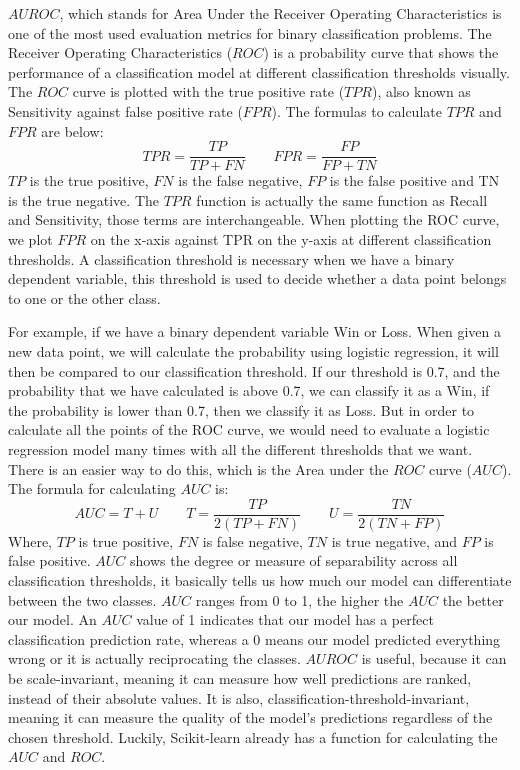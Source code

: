 \documentclass[a4paper,12pt]{report}
\begin{document}
$AUROC$, which stands for Area Under the Receiver Operating Characteristics is one of the most used evaluation metrics for binary classification problems. The Receiver Operating Characteristics ($ROC$) is a probability curve that shows the performance of a classification model at different classification thresholds visually. The $ROC$ curve is plotted with the true positive rate ($TPR$), also known as Sensitivity against false positive rate ($FPR$). The formulas to calculate $TPR$ and $FPR$ are below:
$$TPR=\frac{TP}{TP+FN}\qquad FPR=\frac{FP}{FP+TN}$$
$TP$ is the true positive, $FN$ is the false negative, $FP$ is the false positive and TN is the true negative. The $TPR$ function is actually the same function as Recall and Sensitivity, those terms are interchangeable. When plotting the ROC curve, we plot $FPR$ on the x-axis against TPR on the y-axis at different classification thresholds. A classification threshold is necessary when we have a binary dependent variable, this threshold is used to decide whether a data point belongs to one or the other class.

For example, if we have a binary dependent variable Win or Loss. When given a new data point, we will calculate the probability using logistic regression, it will then be compared to our classification threshold. If our threshold is 0.7, and the probability that we have calculated is above 0.7, we can classify it as a Win, if the probability is lower than 0.7, then we classify it as Loss. But in order to calculate all the points of the ROC curve, we would need to evaluate a logistic regression model many times with all the different thresholds that we want. There is an easier way to do this, which is the Area under the $ROC$ curve ($AUC$). The formula for calculating $AUC$ is:
$$AUC=T+U\qquad T=\frac{TP}{2(TP+FN)}\qquad U=\frac{TN}{2(TN+FP)}$$
Where, $TP$ is true positive, $FN$ is false negative, $TN$ is true negative, and $FP$ is false positive. $AUC$ shows the degree or measure of separability across all classification thresholds, it basically tells us how much our model can differentiate between the two classes. $AUC$ ranges from 0 to 1, the higher the $AUC$ the better our model. An $AUC$ value of 1 indicates that our model has a perfect classification prediction rate, whereas a 0 means our model predicted everything wrong or it is actually reciprocating the classes. $AUROC$ is useful, because it can be scale-invariant, meaning it can measure how well predictions are ranked, instead of their absolute values. It is also, classification-threshold-invariant, meaning it can measure the quality of the model’s predictions regardless of the chosen threshold. Luckily, Scikit-learn already has a function for calculating the $AUC$ and $ROC$.     
\end{document}
